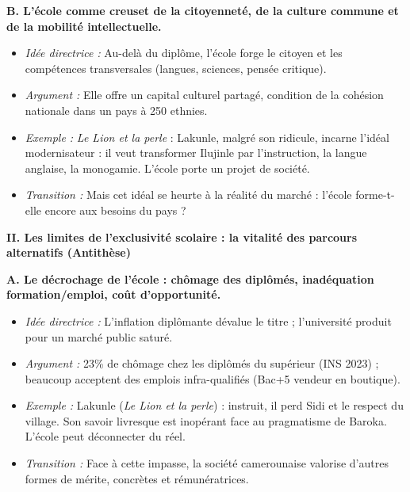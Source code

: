 \documentclass[11pt]{article}
\begin{document}
\begin{exoresolu}
\noindent\textbf{B. L'école comme creuset de la citoyenneté, de la culture commune et de la mobilité intellectuelle.}
\begin{itemize}
    \item \textit{Idée directrice :} Au-delà du diplôme, l'école forge le citoyen et les compétences transversales (langues, sciences, pensée critique).
    \item \textit{Argument :} Elle offre un capital culturel partagé, condition de la cohésion nationale dans un pays à 250 ethnies.
    \item \textit{Exemple :} \emph{Le Lion et la perle} : Lakunle, malgré son ridicule, incarne l'idéal modernisateur : il veut transformer Ilujinle par l'instruction, la langue anglaise, la monogamie. L'école porte un projet de société.
    \item \textit{Transition :} Mais cet idéal se heurte à la réalité du marché : l'école forme-t-elle encore aux besoins du pays ?
\end{itemize}

\noindent\textbf{II. Les limites de l'exclusivité scolaire : la vitalité des parcours alternatifs (Antithèse)}

\noindent\textbf{A. Le décrochage de l'école : chômage des diplômés, inadéquation formation/emploi, coût d'opportunité.}
\begin{itemize}
    \item \textit{Idée directrice :} L'inflation diplômante dévalue le titre ; l'université produit pour un marché public saturé.
    \item \textit{Argument :} 23\% de chômage chez les diplômés du supérieur (INS 2023) ; beaucoup acceptent des emplois infra-qualifiés (Bac+5 vendeur en boutique).
    \item \textit{Exemple :} Lakunle (\emph{Le Lion et la perle}) : instruit, il perd Sidi et le respect du village. Son savoir livresque est inopérant face au pragmatisme de Baroka. L'école peut déconnecter du réel.
    \item \textit{Transition :} Face à cette impasse, la société camerounaise valorise d'autres formes de mérite, concrètes et rémunératrices.
\end{itemize}


\end{exoresolu}
\end{document}
